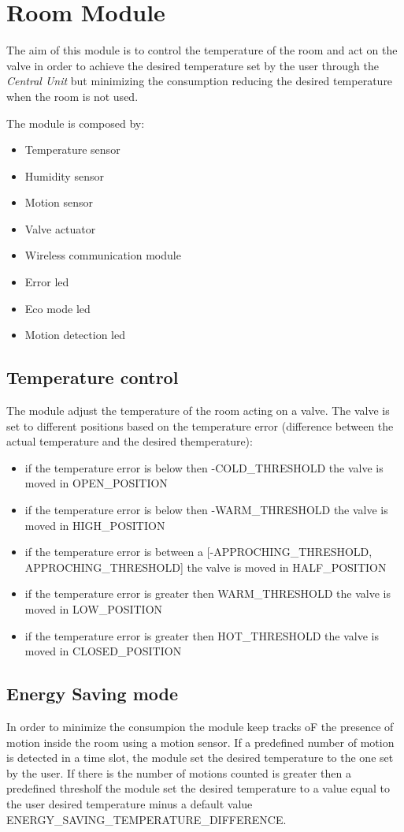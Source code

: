 \section{Room Module}
The aim of this module is to control the temperature of the room and act on the valve in order to 
achieve the desired temperature set by the user through the \textit{Central Unit} but minimizing the consumption
reducing the desired temperature when the room is not used.
\newline

The module is composed by:
\begin{itemize}
	\item Temperature sensor
	\item Humidity sensor
	\item Motion sensor
	\item Valve actuator
	\item Wireless communication module
	\item Error led
	\item Eco mode led
	\item Motion detection led
\end{itemize}

\subsection{Temperature control}
The module adjust the temperature of the room acting on a valve.
The valve is set to different positions based on the temperature error (difference between the actual temperature and the desired themperature):
\begin{itemize}
	\item if the temperature error is below then -COLD\_THRESHOLD the valve is moved in OPEN\_POSITION
	\item if the temperature error is below then -WARM\_THRESHOLD the valve is moved in HIGH\_POSITION
	\item if the temperature error is between a [-APPROCHING\_THRESHOLD, APPROCHING\_THRESHOLD] the valve is moved in HALF\_POSITION
	\item if the temperature error is greater then WARM\_THRESHOLD the valve is moved in LOW\_POSITION
	\item if the temperature error is greater then HOT\_THRESHOLD the valve is moved in CLOSED\_POSITION
\end{itemize}

\subsection{Energy Saving mode}
In order to minimize the consumpion the module keep tracks oF the presence of motion inside the room
using a motion sensor.
If a predefined number of motion is detected in a time slot, the module set the desired temperature to the one set by the user.
If there is the number of motions counted is greater then a predefined thresholf the module set the desired temperature 
to a value equal to the user desired temperature minus a default value ENERGY\_SAVING\_TEMPERATURE\_DIFFERENCE.

